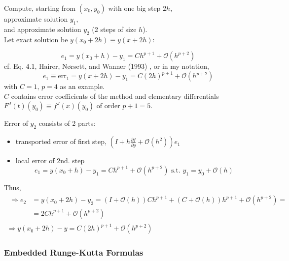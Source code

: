 \documentclass[10pt]{amsart}
\begin{document}
\begin{multicols*}{2}
Compute, starting from $(x_0, y_0)$ with one big step $2h$, \\
approximate solution $y_1$, \\
and approximate solution $y_2$ (2 steps of size $h$). \\

Let exact solution be $y(x_0 + 2h) \equiv y(x + 2h)$:

\begin{equation}
	e_1 = y(x_0 + h) - y_1 = Ch^{p+1} + \mathcal{O}(h^{p + 2})
\end{equation}
cf. Eq. 4.1, Hairer, N\o rsett, and Wanner (1993) \cite{HNW1993}, or in my notation,
\begin{equation}
	e_1 \equiv \text{err}_1 = y(x+2h) - y_1 = C(2h)^{p+1} + \mathcal{O}(h^{p+2})
\end{equation}
with $C = 1$, $p=4$ as an example. \\

$C$ contains error coefficients of the method and elementary differentials $F^J(t)(y_0) \equiv f^J(x)(y_0)$ of order $p+1 =5$.

Error of $y_2$ consists of 2 parts: 
\begin{itemize}
	\item transported error of first step, $(I + h \frac{\partial f}{\partial y} + \mathcal{O}(h^2)) e_1$ 
	\item local error of 2nd. step
	\[
	e_1 = y(x_0 + h) - y_1 = Ch^{p+1} + \mathcal{O}(h^{p+2}) \text{ s.t. } y_1 = y_0 + \mathcal{O}(h)
	\]
\end{itemize}
Thus,
\[
\begin{gathered}
	\begin{aligned}
		\Longrightarrow e_2 & = y(x_0 + 2h) - y_2 = (I + \mathcal{O}(h)) Ch^{p+1} + (C +\mathcal{O}(h))h^{p+1} + \mathcal{O}(h^{p+2}) = \\
		& = 2Ch^{p+1} + \mathcal{O}(h^{p+2})
	\end{aligned} \\
\Longrightarrow y(x_0 + 2h) - y = C(2h)^{p+1} + \mathcal{O}(h^{p+2})
\end{gathered}
\]

\subsubsection{Embedded Runge-Kutta Formulas}


\end{multicols*}
\end{document}
